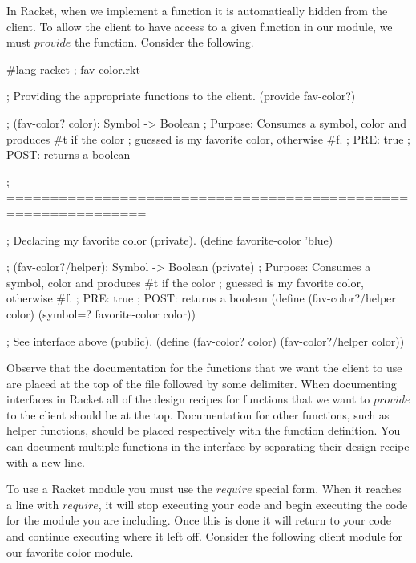 In Racket, when we implement a function it is automatically hidden from the client. To allow the client to have access to a given function in our module, we must $provide$ the function. Consider the following.\\

\clearpage
{}

\begin{code}[Lisp]
#lang racket ; fav-color.rkt

; Providing the appropriate functions to the client.
(provide fav-color?)

; (fav-color? color): Symbol -> Boolean
; Purpose: Consumes a symbol, color and produces #t if the color
;          guessed is my favorite color, otherwise #f.
; PRE: true
; POST: returns a boolean

; ==============================================================

; Declaring my favorite color (private).
(define favorite-color 'blue)

; (fav-color?/helper): Symbol -> Boolean (private)
; Purpose: Consumes a symbol, color and produces #t if the color
;          guessed is my favorite color, otherwise #f.
; PRE: true
; POST: returns a boolean
(define (fav-color?/helper color)
	(symbol=? favorite-color color))

; See interface above (public).
(define (fav-color? color)
	(fav-color?/helper color))
\end{code}

Observe that the documentation for the functions that we want the client to use are placed at the top of the file followed by some delimiter. When documenting interfaces in Racket all of the design recipes for functions that we want to $provide$ to the client should be at the top. Documentation for other functions, such as helper functions, should be placed respectively with the function definition. You can document multiple functions in the interface by separating their design recipe with a new line.\\


To use a Racket module you must use the $require$ special form. When it reaches a line with $require$, it will stop executing your code and begin executing the code for the module you are including. Once this is done it will return to your code and continue executing where it left off. Consider the following client module for our favorite color module.\\

